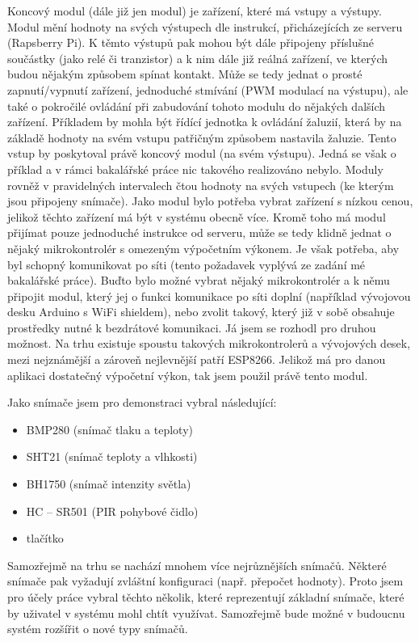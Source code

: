 Koncový modul (dále již jen modul) je zařízení, které má vstupy a výstupy. Modul mění hodnoty na svých výstupech dle instrukcí, přicházejících ze serveru (Rapsberry Pi). K těmto výstupů pak mohou být dále připojeny příslušné součástky (jako relé či tranzistor) a k nim dále již reálná zařízení, ve kterých budou nějakým způsobem spínat kontakt. Může se tedy jednat o prosté zapnutí/vypnutí zařízení, jednoduché stmívání (PWM modulací na výstupu), ale také o pokročilé ovládání při zabudování tohoto modulu do nějakých dalších zařízení. Příkladem by mohla být řídící jednotka k ovládání žaluzií, která by na základě hodnoty na svém vstupu patřičným způsobem nastavila žaluzie. Tento vstup by poskytoval právě koncový modul (na svém výstupu). Jedná se však o příklad a v rámci bakalářské práce nic takového realizováno nebylo.
Moduly rovněž v pravidelných intervalech čtou hodnoty na svých vstupech (ke kterým jsou připojeny snímače). Jako modul bylo potřeba vybrat zařízení s nízkou cenou, jelikož těchto zařízení má být v systému obecně více. Kromě toho má modul přijímat pouze jednoduché instrukce od serveru, může se tedy klidně jednat o nějaký mikrokontrolér s omezeným výpočetním výkonem. Je však potřeba, aby byl schopný komunikovat po síti (tento požadavek vyplývá ze zadání mé bakalářské práce). Buďto bylo možné vybrat nějaký mikrokontrolér a k němu připojit modul, který jej o funkci komunikace po síti doplní (například vývojovou desku Arduino s WiFi shieldem), nebo zvolit takový, který již v sobě obsahuje prostředky nutné k bezdrátové komunikaci. Já jsem se rozhodl pro druhou možnost. Na trhu existuje spoustu takových mikrokontrolerů a vývojových desek, mezi nejznámější a zároveň nejlevnější patří ESP8266. Jelikož má pro danou aplikaci dostatečný výpočetní výkon, tak jsem použil právě tento modul.

Jako snímače jsem pro demonstraci vybral následující:
\begin{itemize}
    \item BMP280 (snímač tlaku a teploty)
    \item SHT21 (snímač teploty a vlhkosti)
    \item BH1750 (snímač intenzity světla)
    \item HC -- SR501 (PIR pohybové čidlo)
    \item tlačítko
\end{itemize}
Samozřejmě na trhu se nachází mnohem více nejrůznějších snímačů. Některé snímače pak vyžadují zvláštní konfiguraci (např. přepočet hodnoty). Proto jsem pro účely práce vybral těchto několik, které reprezentují základní snímače, které by uživatel v systému mohl chtít využívat. Samozřejmě bude možné v budoucnu systém rozšířit o nové typy snímačů.

